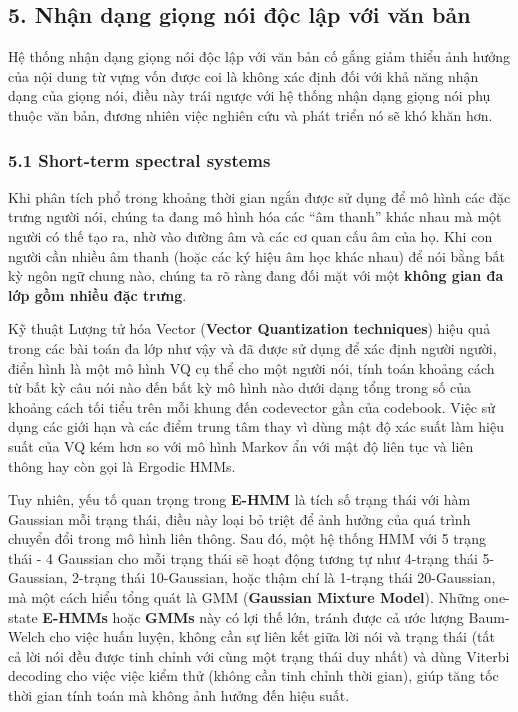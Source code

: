 \documentclass{article}
\begin{document}
	\subsection{5. Nhận dạng giọng nói độc lập với văn bản}
	\qquad Hệ thống nhận dạng giọng nói độc lập với văn bản cố gắng giảm thiểu ảnh hưởng của nội dung từ vựng vốn được coi là không xác định đối với khả năng nhận dạng của giọng nói, điều này trái ngược với hệ thống nhận dạng giọng nói phụ thuộc văn bản, đương nhiên việc nghiên cứu và phát triển nó sẽ khó khăn hơn.
	
	\subsubsection{5.1 Short-term spectral systems}
	\qquad Khi phân tích phổ trong khoảng thời gian ngắn được sử dụng để mô hình các đặc trưng người nói, chúng ta đang mô hình hóa các “âm thanh” khác nhau mà một người có thế tạo ra, nhờ vào đường âm và các cơ quan cấu âm của họ. Khi con người cần nhiều âm thanh (hoặc các ký hiệu âm học khác nhau) để nói bằng bất kỳ ngôn ngữ chung nào, chúng ta rõ ràng đang đối mặt với một \textbf{không gian đa lớp gồm nhiều đặc trưng}.
	
	Kỹ thuật Lượng tử hóa Vector (\textbf{Vector Quantization techniques}) hiệu quả trong các bài toán đa lớp như vậy và đã được sử dụng để xác định người người, điển hình là một mô hình VQ cụ thể cho một người nói, tính toán khoảng cách từ bất kỳ câu nói nào đến bất kỳ mô hình nào dưới dạng tổng trong số của khoảng cách tối tiểu trên mỗi khung đến codevector gần của codebook. Việc sử dụng các giới hạn và các điểm trung tâm thay vì dùng mật độ xác suất làm hiệu suất của VQ kém hơn so với mô hình Markov ẩn với mật độ liên tục và liên thông hay còn gọi là Ergodic HMMs. 
	
	Tuy nhiên, yếu tố quan trọng trong \textbf{E-HMM} là tích số trạng thái với hàm Gaussian mỗi trạng thái, điều này loại bỏ triệt để ảnh hưởng của quá trình chuyển đổi trong mô hình liên thông. Sau đó, một hệ thống HMM với 5 trạng thái - 4 Gaussian cho mỗi trạng thái sẽ hoạt động tương tự như 4-trạng thái 5-Gaussian, 2-trạng thái 10-Gaussian, hoặc thậm chí là 1-trạng thái 20-Gaussian,  mà một cách hiểu tổng quát là GMM (\textbf{Gaussian Mixture Model}). Những one-state \textbf{E-HMMs} hoặc \textbf{GMMs} này có lợi thế lớn, tránh được cả ước lượng Baum-Welch cho việc huấn luyện, không cần sự liên kết giữa lời nói và trạng thái (tất cả lời nói đều được tinh chỉnh với cùng một trạng thái duy nhất) và dùng Viterbi decoding cho việc việc kiểm thử (không cần tinh chỉnh thời gian), giúp tăng tốc thời gian tính toán mà không ảnh hưởng đến hiệu suất.
	
\end{document}
